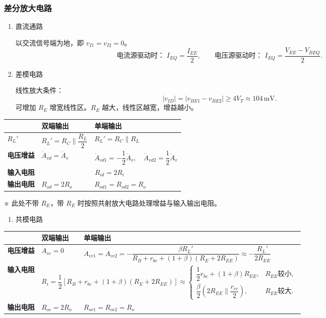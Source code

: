 \documentclass[UTF8,fontset=fandol,zihao=5]{ctexart}
\newcommand{\parallelsum}{\mathbin{\|}}
\begin{document}
\subsubsection{差分放大电路}

\begin{enumerate}
  \item 直流通路

  以交流信号端为地，即 $v_{I1}=v_{I2}=0$。
  \[
    \text{电流源驱动时： }I_{EQ}=\frac{I_{EE}}{2},
    \qquad
    \text{电压源驱动时： }I_{EQ}=\frac{V_{EE}-V_{BEQ}}{2}.
  \]

  \item 差模电路

  线性放大条件：
  \[
    |v_{ID}|=|v_{BE1}-v_{BE2}|\geq4V_T\approx104\,\mathrm{mV}.
  \]
  可增加 $R_E$ 增宽线性区。$R_E$ 越大，线性区越宽，增益越小。
\end{enumerate}

\begin{center}
\renewcommand{\arraystretch}{1.45}
\begin{tabularx}{0.96\textwidth}{>{\bfseries}p{2cm}XX}
\toprule
 & 双端输出 & 单端输出 \\
\midrule
$R_L'$ & $R_L'=R_C\parallelsum\dfrac{R_L}{2}$ & $R_L'=R_C\parallelsum R_L$ \\
电压增益 & $\dot A_{vd}=\dot A_v$ & $\dot A_{vd1}=-\dfrac12\dot A_v,\quad \dot A_{vd2}=\dfrac12\dot A_v$ \\
输入电阻 & \multicolumn{2}{c}{$R_{id}=2R_i$} \\
输出电阻 & $R_{od}=2R_o$ & $R_{od1}=R_{od2}=R_o$ \\
\bottomrule
\end{tabularx}
\end{center}

※ 此处不带 $R_E$，带 $R_E$ 时按照共射放大电路处理增益与输入输出电阻。

\begin{enumerate}[resume]
  \item 共模电路
\end{enumerate}

\begin{center}
\scriptsize
\renewcommand{\arraystretch}{1.45}
\begin{tabularx}{\textwidth}{>{\bfseries}p{1.8cm}XX}
\toprule
 & 双端输出 & 单端输出 \\
\midrule
电压增益 & $\dot A_{vc}=0$ & $\dot A_{vc1}=\dot A_{vc2}=-\dfrac{\beta R_L'}{R_B+r_{be}+(1+\beta)(R_E+2R_{EE})}\approx-\dfrac{R_L'}{2R_{EE}}$ \\
输入电阻 & \multicolumn{2}{c}{$R_i=\dfrac12[R_B+r_{be}+(1+\beta)(R_E+2R_{EE})]\approx\begin{cases}\dfrac12r_{be}+(1+\beta)R_{EE},&R_{EE}\text{较小},\\[2pt]\dfrac\beta2(2R_{EE}\parallelsum\dfrac{r_{ce}}2),&R_{EE}\text{较大}.\end{cases}$} \\
输出电阻 & $R_{oc}=2R_o$ & $R_{oc1}=R_{oc2}=R_o$ \\
\bottomrule
\end{tabularx}
\end{center}
\end{document}
